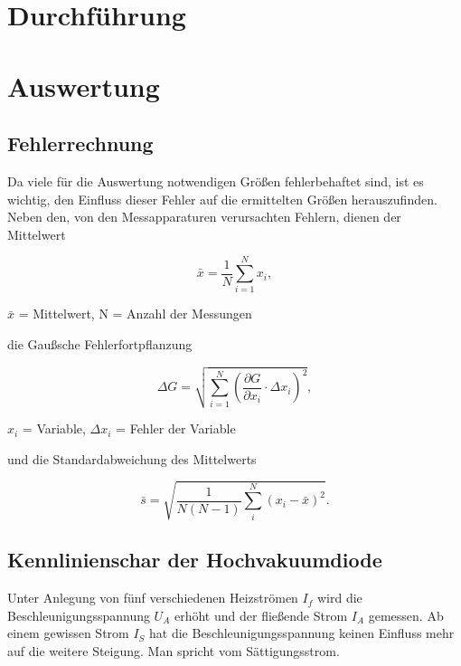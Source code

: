 \section{Durchführung}









\section{Auswertung}
\subsection{Fehlerrechnung}
Da viele für die Auswertung notwendigen Größen fehlerbehaftet sind, ist es wichtig, den Einfluss dieser Fehler auf die ermittelten
Größen herauszufinden. Neben den, von den Messapparaturen verursachten Fehlern, dienen der Mittelwert
\begin{formel}
\begin{equation}
 \bar{x} = \frac1N \sum_{i=1}^{N} x_i,
\end{equation}
\caption*{\small{$\bar{x}$ = Mittelwert, N = Anzahl der Messungen}}
\end{formel}

die Gaußsche Fehlerfortpflanzung

\begin{formel}
\begin{equation}
\Delta G = \sqrt{\sum_{i=1}^{N}\left( \frac{\partial G}{\partial x_i}\cdot \Delta x_i\right)^2},
\label{gauss}
\end{equation}
\caption*{$x_i$ = Variable, $\Delta x_i$ = Fehler der Variable}
\end{formel}

und die Standardabweichung des Mittelwerts

\begin{equation}
 \bar s = \sqrt{\frac{1}{N(N-1)} \sum_{i}^{N} (x_i - \bar{x})^2}.
\end{equation}

\subsection{Kennlinienschar der Hochvakuumdiode}
\label{a}
Unter Anlegung von fünf verschiedenen Heizströmen $I_f$ wird die Beschleunigungsspannung $U_A$ erhöht und der fließende Strom $I_A$ 
gemessen. Ab einem gewissen Strom $I_S$ hat die Beschleunigungsspannung keinen Einfluss mehr auf die weitere Steigung. Man spricht vom
Sättigungsstrom.

